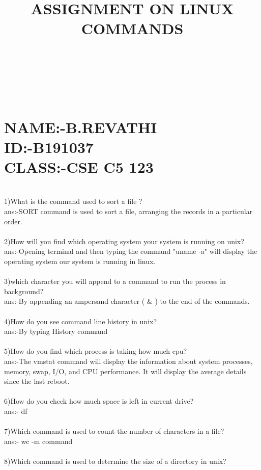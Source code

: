 \documentclass{article}
\begin{document}
\title{ASSIGNMENT ON LINUX COMMANDS}
\date{}

\maketitle
\\
\section*{\\
NAME:-B.REVATHI\\
ID:-B191037\\
CLASS:-CSE C5 123\\}
\Large{
\\1)What is the command used to sort a file ?\\
ans:-SORT command is used to sort a file, arranging the records in a particular order.\\
\\
2)How will you find which operating system your system is running on unix?\\
ans:-Opening terminal and then typing the command "uname -a" will display the operating system
our system is running in linux.\\
\\
3)which character you will append to a command to run the process in background?\\
ans:-By appending an ampersand character ( \& ) to the end of the commands.\\
\\
4)How do you see command line history in unix?\\
ans:-By typing History command\\
\\
5)How do you find which process is taking how much cpu?\\
ans:-The vmstat command will display the information about system processes, memory, swap, I/O,
and CPU performance. It will display the average details since the last reboot.\\
\\
6)How do you check how much space is left in current drive?\\
ans:- df\\
\\
7)Which command is used to count the number of characters in a file?\\
ans:- wc -m command\\
\\
8)Which command is used to determine the size of a directory in unix?\\
}
\end{document}
